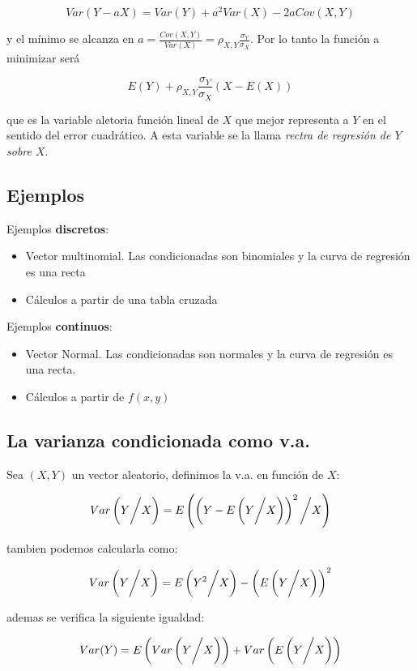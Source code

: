 \[ Var(Y - aX) = Var(Y) + a^2Var(X) - 2aCov(X,Y) \]

y el mínimo se alcanza en $a = \frac{Cov(X,Y)}{Var(X)} = \rho_{X,Y}\frac{\sigma_Y}{\sigma_X}$. Por lo tanto la función a minimizar será

\[ E(Y) + \rho_{X,Y}\frac{\sigma_Y}{\sigma_X}(X - E(X)) \]

que es la variable aletoria función lineal de $X$ que mejor representa a $Y$ en el sentido del error cuadrático. A esta variable
se la llama \textit{rectra de regresión de $Y$ sobre $X$}.

\subsection{Ejemplos}

Ejemplos \textbf{discretos}:
\begin{itemize}
    \item Vector multinomial. Las condicionadas son binomiales y la curva de regresión es una recta
    \item Cálculos a partir de una tabla cruzada
\end{itemize}
Ejemplos \textbf{continuos}:
\begin{itemize}
    \item Vector Normal. Las condicionadas son normales y la curva de regresión es una recta.
    \item Cálculos a partir de $f(x,y)$
\end{itemize}

\subsection{La varianza condicionada como v.a.}

Sea $(X,Y)$ un vector aleatorio, definimos la v.a. en función de $X$:

\[ Var\left( Y \bigg{/} X \right) = E\left( \left( Y - E \left( Y \bigg{/} X \right) \right)^2 \bigg{/} X \right)\]

tambien podemos calcularla como:

\[ Var\left( Y \bigg{/} X \right) = E\left( Y^2 \bigg{/} X \right) - \left( E\left( Y \bigg{/} X \right) \right)^2 \]

ademas se verifica la siguiente igualdad:

\[ Var(Y) = E\left( Var\left( Y \bigg{/} X \right) \right) + Var\left( E\left( Y \bigg{/} X \right) \right) \]
